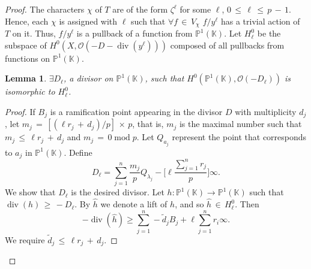 \documentclass[]{amsart}
\numberwithin{equation}{section}
\newtheorem{lemma}[theorem]{Lemma}
\DeclareMathOperator{\divOp}{div}
\DeclareMathOperator{\modOp}{mod}
\begin{document}
\begin{proof}
 The characters $\chi$ of $T$ are of the form $\zeta^{\ell}$ for some $\ell$,
$0\,{\leq}\, \ell \,{\leq}\, p\,{-}\,1$. Hence, each $\chi$ is assigned with 
$\ell$ such that $\forall f \,{\in}\, V_{\chi}$ $f/y^{\ell}$ has a trivial action of $T$ on it. 
Thus, $f/y^{\ell}$ is a pullback of a function from $\mathbb{P}^{1}(\mathbb{K})$.
Let $H_{\ell}^{0}$ be the subspace of $H^0(X,\mathcal{O}(-D-\divOp(y^{\ell})))$ 
composed of all pullbacks from functions on $\mathbb{P}^{1}(\mathbb{K}).$
\begin{lemma}
$\exists D_{\ell}$, a divisor on $\mathbb{P}^{1}(\mathbb{K})$, 
such that $H^{0}(\mathbb{P}^{1}(\mathbb{K}),\mathcal{O}(-D_{\ell}))$ is isomorphic to $H^{0}_{\ell}$.
\end{lemma}
\begin{proof}
If $B_j$ is a ramification point appearing in the divisor $D$
with multiplicity $d_j$, 
let $m_j\,{=}\,[(\ell r_j\,{+}\,d_j)/p ]\,{\times}\, p$, that is,  $m_j$ is the maximal number such that 
$m_j \,{\leq}\, \ell r_j\,{+}\,d_j$ and $m_j \,{=}\, 0 \modOp p$. 
Let  $Q_{a_j}$ represent the point that corresponds 
to $a_j$ in $\mathbb{P}^{1}(\mathbb{K})$. Define
\begin{equation}
D_{\ell} = \sum_{j=1}^n \frac{m_j}{p} Q_{\lambda_j}-
\bigg[\ell \frac{\sum_{j=1}^n r_j}{p}\bigg] \infty.
\end{equation} 
We show that $D_{\ell}$ is the desired divisor. Let $h:\mathbb{P}^{1}(\mathbb{K})\to \mathbb{P}^{1}(\mathbb{K})$ 
such that $\divOp (h) \,{\geq}\, {-} D_{\ell}$.  By $\widehat{h}$ we denote a lift of $h$, 
and so $\widehat{h} \,{\in}\, H_{\ell}^{0}$.  Then
\begin{equation}
-\divOp (\widehat{h})\geq \sum_{j=1}^n -\tilde{d}_j B_j+ \ell \sum_{j=1}^n  r_i\infty.
\end{equation}
We require $\tilde{d}_j \,{\leq}\, \ell r_j \,{+}\, d_j$. 


\end{proof}
\end{proof}
\end{document}
